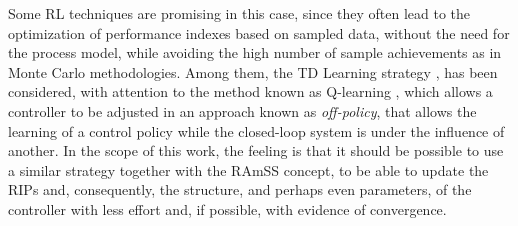 Some RL techniques are promising in this case, since they often lead to the optimization of performance indexes based on sampled data, without the need for the process model, while avoiding the high number of sample achievements as in Monte Carlo methodologies. Among them, the TD Learning strategy \citep{sutton2018},
has been considered, with attention to the method known as Q-learning \cite{watkins1992}, which allows a controller to be adjusted in an approach known as \textit{off-policy}, that allows the learning of a control policy while the closed-loop system is under the influence of another. In the scope of this work, the feeling is that it should be possible to use a similar strategy together with the RAmSS concept, to be able to update the RIPs and, consequently, the structure, and perhaps even parameters, of the controller with less effort and, if possible, with evidence of convergence.




